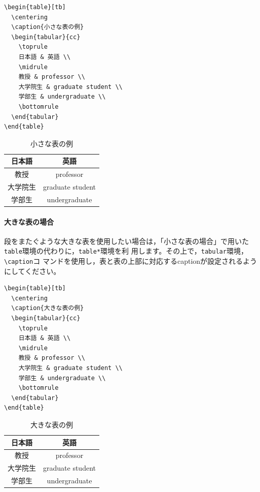 \documentclass[b5paper,10pt,twocolumn,tombow]{jarticle}
\begin{document}
\begin{verbatim}
\begin{table}[tb]
  \centering
  \caption{小さな表の例}
  \begin{tabular}{cc}
    \toprule
    日本語 & 英語 \\
    \midrule
    教授 & professor \\
    大学院生 & graduate student \\
    学部生 & undergraduate \\
    \bottomrule
  \end{tabular}
\end{table}
\end{verbatim}

\begin{table}[tb]
  \centering
  \caption{小さな表の例}
  \begin{tabular}{cc}
    \toprule
    日本語 & 英語 \\
    \midrule
    教授 & professor \\
    大学院生 & graduate student \\
    学部生 & undergraduate \\
    \bottomrule
  \end{tabular}
\end{table}

\paragraph*{大きな表の場合}
段をまたぐような大きな表を使用したい場合は，「小さな表の場合」で用いた
\texttt{table}環境の代わりに，\texttt{table*}環境を利
用します。その上で，\texttt{tabular}環境，\verb|\caption|コ
マンドを使用し，表と表の上部に対応するcaptionが設定されるようにしてください。

\begin{verbatim}
\begin{table}[tb]
  \centering
  \caption{大きな表の例}
  \begin{tabular}{cc}
    \toprule
    日本語 & 英語 \\
    \midrule
    教授 & professor \\
    大学院生 & graduate student \\
    学部生 & undergraduate \\
    \bottomrule
  \end{tabular}
\end{table}
\end{verbatim}

\begin{table}[tb]
  \centering
  \caption{大きな表の例}
  \begin{tabular}{cc}
    \toprule
    日本語 & 英語 \\
    \midrule
    教授 & professor \\
    大学院生 & graduate student \\
    学部生 & undergraduate \\
    \bottomrule
  \end{tabular}
\end{table}
\end{document}
